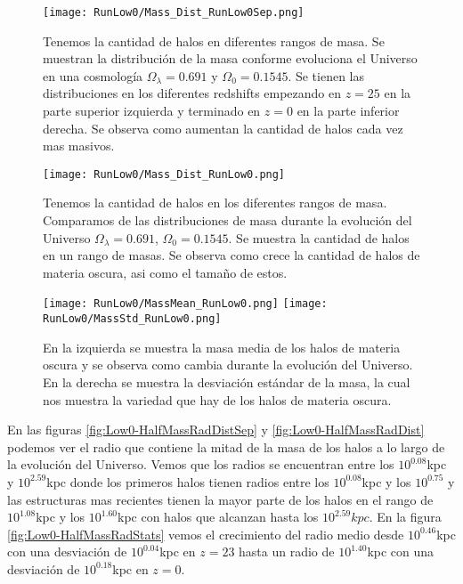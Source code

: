 \begin{figure}[H]
    \centering
    \texttt{[image: RunLow0/Mass\_Dist\_RunLow0Sep.png]}
    \caption[Distribución de masa en la evolución de un Universo $\Omega_\lambda = 0.691$, $\Omega_0 = 0.1545$]{\footnotesize Tenemos la cantidad de halos en diferentes rangos de masa. Se muestran la distribución de la masa conforme evoluciona el Universo en una cosmología $\Omega_\lambda = 0.691$ y $\Omega_0 = 0.1545$. Se tienen las distribuciones en los diferentes redshifts empezando en $z=25$ en la parte superior izquierda y terminado en $z=0$ en la parte inferior derecha. Se observa como aumentan la cantidad de halos cada vez mas masivos.}
    \label{fig:Low0-MassDistSep}
\end{figure}

\begin{figure}[H]
    \centering
    \texttt{[image: RunLow0/Mass\_Dist\_RunLow0.png]}
    \caption[Comparación de distribución de masa en un Universo $\Omega_\lambda = 0.691$, $\Omega_0 = 0.1545$]{\footnotesize Tenemos la cantidad de halos en los diferentes rangos de masa. Comparamos de las distribuciones de masa durante la evolución del Universo $\Omega_\lambda = 0.691$, $\Omega_0 = 0.1545$. Se muestra la cantidad de halos en un rango de masas. Se observa como crece la cantidad de halos de materia oscura, asi como el tamaño de estos.}
    \label{fig:Low0-MassDist}
\end{figure}

\begin{figure}[H]
    \centering
    \texttt{[image: RunLow0/MassMean\_RunLow0.png]}
    \texttt{[image: RunLow0/MassStd\_RunLow0.png]}
    \caption[Media y desviación estándar de la distribución de masa de un Universo $\Omega_\lambda = 0.691$, $\Omega_0 = 0.1545$]{\footnotesize En la izquierda se muestra la masa media de los halos de materia oscura y se observa como cambia durante la evolución del Universo. En la derecha se muestra la desviación estándar de la masa, la cual nos muestra la variedad que hay de los halos de materia oscura.}
    \label{fig:Low0-MassStats}
\end{figure}

En las figuras \ref{fig:Low0-HalfMassRadDistSep} y \ref{fig:Low0-HalfMassRadDist} podemos ver el radio que contiene la mitad de la masa de los halos a lo largo de la evolución del Universo. Vemos que los radios se encuentran entre los $10^{0.08}$kpc y $10^{2.59}$kpc donde los primeros halos tienen radios entre los $10^{0.08}$kpc y los $10^{0.75}$ y las estructuras mas recientes tienen la mayor parte de los halos en el rango de $10^{1.08}$kpc y los $10^{1.60}$kpc con halos que alcanzan hasta los $10^{2.59}kpc$. En la figura \ref{fig:Low0-HalfMassRadStats} vemos el crecimiento del radio medio desde $10^{0.46}$kpc con una desviación de $10^{0.04}$kpc en $z=23$ hasta un radio de $10^{1.40}$kpc con una desviación de $10^{0.18}$kpc en $z=0$.

